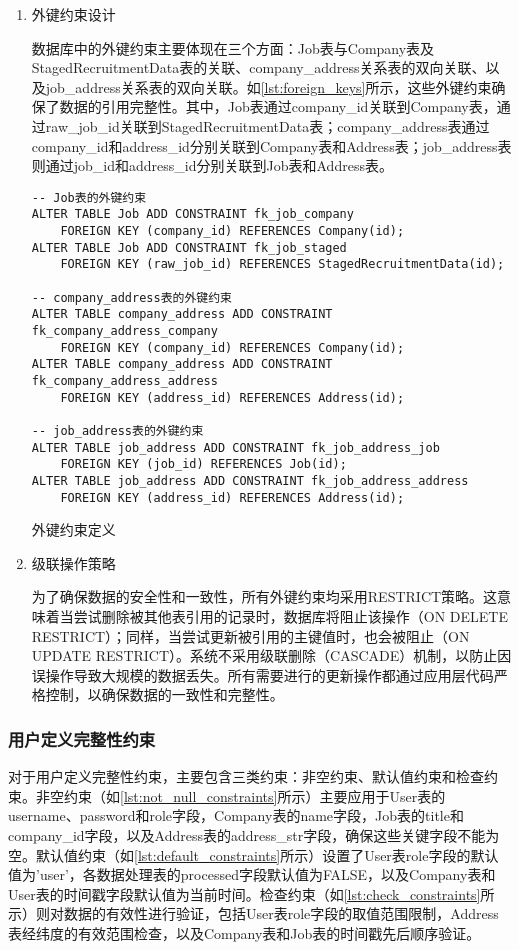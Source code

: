 \begin{enumerate}
  \item 外键约束设计
  
  数据库中的外键约束主要体现在三个方面：Job表与Company表及StagedRecruitmentData表的关联、company\_address关系表的双向关联、以及job\_address关系表的双向关联。如\cref{lst:foreign_keys}所示，这些外键约束确保了数据的引用完整性。其中，Job表通过company\_id关联到Company表，通过raw\_job\_id关联到StagedRecruitmentData表；company\_address表通过company\_id和address\_id分别关联到Company表和Address表；job\_address表则通过job\_id和address\_id分别关联到Job表和Address表。

  \begin{listing}[htbp]
    \begin{verbatim}
-- Job表的外键约束
ALTER TABLE Job ADD CONSTRAINT fk_job_company
    FOREIGN KEY (company_id) REFERENCES Company(id);
ALTER TABLE Job ADD CONSTRAINT fk_job_staged
    FOREIGN KEY (raw_job_id) REFERENCES StagedRecruitmentData(id);

-- company_address表的外键约束
ALTER TABLE company_address ADD CONSTRAINT fk_company_address_company
    FOREIGN KEY (company_id) REFERENCES Company(id);
ALTER TABLE company_address ADD CONSTRAINT fk_company_address_address
    FOREIGN KEY (address_id) REFERENCES Address(id);

-- job_address表的外键约束
ALTER TABLE job_address ADD CONSTRAINT fk_job_address_job
    FOREIGN KEY (job_id) REFERENCES Job(id);
ALTER TABLE job_address ADD CONSTRAINT fk_job_address_address
    FOREIGN KEY (address_id) REFERENCES Address(id);
    \end{verbatim}
    \caption{外键约束定义}\label{lst:foreign_keys}
  \end{listing}

  \item 级联操作策略
  
  为了确保数据的安全性和一致性，所有外键约束均采用RESTRICT策略。这意味着当尝试删除被其他表引用的记录时，数据库将阻止该操作（ON DELETE RESTRICT）；同样，当尝试更新被引用的主键值时，也会被阻止（ON UPDATE RESTRICT）。系统不采用级联删除（CASCADE）机制，以防止因误操作导致大规模的数据丢失。所有需要进行的更新操作都通过应用层代码严格控制，以确保数据的一致性和完整性。
\end{enumerate}

\subsubsection{用户定义完整性约束}
对于用户定义完整性约束，主要包含三类约束：非空约束、默认值约束和检查约束。非空约束（如\cref{lst:not_null_constraints}所示）主要应用于User表的username、password和role字段，Company表的name字段，Job表的title和company\_id字段，以及Address表的address\_str字段，确保这些关键字段不能为空。默认值约束（如\cref{lst:default_constraints}所示）设置了User表role字段的默认值为'user'，各数据处理表的processed字段默认值为FALSE，以及Company表和User表的时间戳字段默认值为当前时间。检查约束（如\cref{lst:check_constraints}所示）则对数据的有效性进行验证，包括User表role字段的取值范围限制，Address表经纬度的有效范围检查，以及Company表和Job表的时间戳先后顺序验证。


